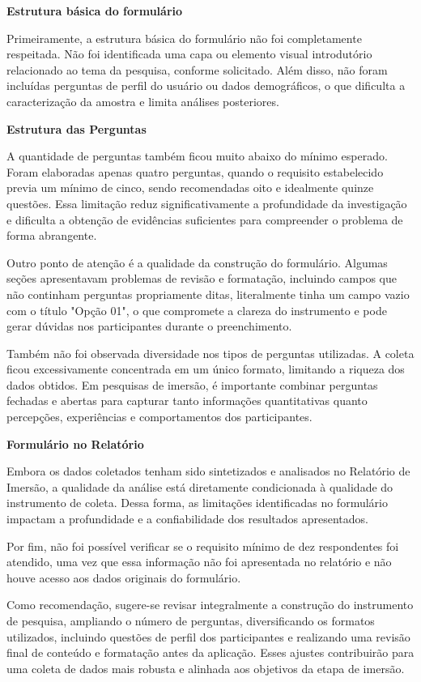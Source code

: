 \documentclass[
  sigconf,
  nonacm, %
  language=portuguese
]{acmart}
\begin{document}
\textbf{Estrutura básica do formulário}

Primeiramente, a estrutura básica do formulário não foi completamente respeitada. Não foi identificada uma capa ou elemento visual introdutório relacionado ao tema da pesquisa, conforme solicitado. Além disso, não foram incluídas perguntas de perfil do usuário ou dados demográficos, o que dificulta a caracterização da amostra e limita análises posteriores.

\textbf{Estrutura das Perguntas}

A quantidade de perguntas também ficou muito abaixo do mínimo esperado. Foram elaboradas apenas quatro perguntas, quando o requisito estabelecido previa um mínimo de cinco, sendo recomendadas oito e idealmente quinze questões. Essa limitação reduz significativamente a profundidade da investigação e dificulta a obtenção de evidências suficientes para compreender o problema de forma abrangente.

Outro ponto de atenção é a qualidade da construção do formulário. Algumas seções apresentavam problemas de revisão e formatação, incluindo campos que não continham perguntas propriamente ditas, literalmente tinha um campo vazio com o título "Opção 01", o que compromete a clareza do instrumento e pode gerar dúvidas nos participantes durante o preenchimento.

Também não foi observada diversidade nos tipos de perguntas utilizadas. A coleta ficou excessivamente concentrada em um único formato, limitando a riqueza dos dados obtidos. Em pesquisas de imersão, é importante combinar perguntas fechadas e abertas para capturar tanto informações quantitativas quanto percepções, experiências e comportamentos dos participantes.

\textbf{Formulário no Relatório}

Embora os dados coletados tenham sido sintetizados e analisados no Relatório de Imersão, a qualidade da análise está diretamente condicionada à qualidade do instrumento de coleta. Dessa forma, as limitações identificadas no formulário impactam a profundidade e a confiabilidade dos resultados apresentados.

Por fim, não foi possível verificar se o requisito mínimo de dez respondentes foi atendido, uma vez que essa informação não foi apresentada no relatório e não houve acesso aos dados originais do formulário.

Como recomendação, sugere-se revisar integralmente a construção do instrumento de pesquisa, ampliando o número de perguntas, diversificando os formatos utilizados, incluindo questões de perfil dos participantes e realizando uma revisão final de conteúdo e formatação antes da aplicação. Esses ajustes contribuirão para uma coleta de dados mais robusta e alinhada aos objetivos da etapa de imersão.
\end{document}
